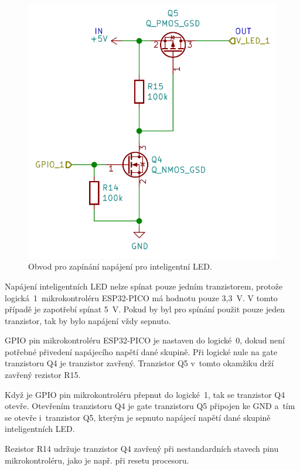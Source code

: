   \begin{figure}[!h]
    \begin{center}
      \includegraphics[scale=0.45]{obrazky/Zapinani_napajeni_LED.png}
    \end{center}
    \caption[Obvod pro zapínání napájení pro inteligentní LED]{Obvod pro zapínání napájení pro inteligentní LED.}
  \end{figure}

  Napájení inteligentních LED nelze spínat pouze jedním tranzistorem, protože logická~1~mikrokontroléru ESP32-PICO má hodnotu pouze 3,3~V. 
  V tomto případě je zapotřebí spínat 5~V. Pokud by byl pro spínání použit pouze jeden tranzistor, tak by bylo napájení vždy sepnuto.

  GPIO pin mikrokontroléru ESP32-PICO je nastaven do logické~0, dokud není potřebné přivedení napájecího napětí dané skupině. 
  Při logické nule na gate 
  tranzistoru Q4 je tranzistor zavřený. Tranzistor Q5 v~tomto okamžiku drží zavřený rezistor R15.

  Když je GPIO pin mikrokontroléru přepnut do logické~1, tak se tranzistor Q4 otevře. Otevřením tranzistoru Q4 je gate tranzistoru Q5 
  připojen ke GND a~tím se otevře i~tranzistor Q5, kterým je sepnuto napájecí napětí dané skupině inteligentních LED.

  Rezistor R14 udržuje tranzistor Q4 zavřený při nestandardních stavech pinu mikrokontroléru, jako je např. při resetu procesoru.

